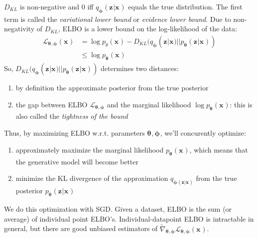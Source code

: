 \documentclass{article}
\begin{document}
$ D_{ KL }  $ is non-negative and 0 iff $ q_{ \bm{\phi}_{} } (\bm{z}_{}|\bm{x}_{})  $ equals
the true distribution.
The first term is called the \textit{variational lower bound} or
\textit{evidence lower bound}.
Due to non-negativity of $ D_{ KL }  $, ELBO is a lower bound
on the log-likelihood of the data:
\begin{align}
		\mathcal{L}_{ \bm{\theta}_{}, \bm{\phi}_{} } (\bm{x}_{}) &=
\log p_{ \theta } (\bm{x}_{}) - D_{ KL } (q_{ \bm{\phi}_{} } (\bm{z}_{}|\bm{x}_{}) 
|| p_{ \bm{\theta}_{} } (\bm{z}_{}|\bm{x}_{})) \\
&\leq
\log p_{ \bm{\theta}_{} } (\bm{x}_{})
\end{align}
So, $D_{ KL } (q_{ \bm{\phi}_{} } (\bm{z}_{}|\bm{x}_{}) 
|| p_{ \bm{\theta}_{} } (\bm{z}_{}|\bm{x}_{}))$
determines two distances:
\begin{enumerate}
		\item by definition the approximate posterior from the true posterior
		\item the gap between ELBO $ \mathcal{L}_{ \bm{\theta}_{}, \bm{\phi}_{} }  $
				and the marginal likelihood $ \log p_{ \bm{\theta}_{} } (\bm{x}_{})  $:
				this is also called the \textit{tightness of the bound}
\end{enumerate}
Thus, by maximizing ELBO w.r.t. parameters $ \bm{\theta}_{}, \bm{\phi}_{}  $,
we'll concurently optimize:
\begin{enumerate}
		\item approximately maximize the marginal likelihood $ p_{ \bm{\theta}_{} } (\bm{x}_{})  $, which
				means that the generative model will become better
		\item minimize the KL divergence of the approximation $ q_{ \bm{\phi}_{} (\bm{z}_{}|\bm{x}_{}) }  $
				from the true posterior $  p_{ \bm{\theta}_{} } (\bm{z}_{}|\bm{x}_{}) $
\end{enumerate}
We do this optimization with SGD.
Given a dataset, ELBO is the sum (or average) of individual point ELBO's.
Individual-datapoint ELBO is intractable in general, but there are good 
unbiased estimators of
$ \tilde{\nabla}_{ \bm{\theta}_{}, \bm{\phi}_{} } \mathcal{L}_{ \bm{\theta}_{}, \bm{\phi}_{}   }  (\bm{x}_{}) $.
\end{document}

